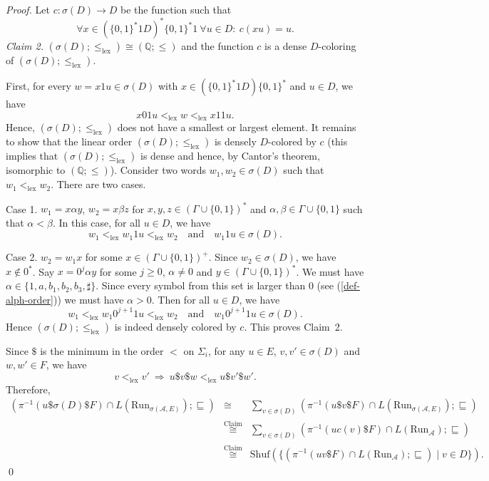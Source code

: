 \documentclass[envcountsame]{llncs}
\newcommand{\A}{\mathcal A}
\newcommand{\lex}{\mathrm{lex}}
\newcommand{\Q}{\mathbb Q}
\newcommand{\Run}{\mathrm{Run}}
\newcommand{\Shuf}{\mathrm{Shuf}}
\begin{document}
\begin{proof}
\medskip

\noindent
Let $c:\sigma(D)\rightarrow D$ be the function such that
\[
    \forall x\in (\{0,1\}^*1D)^*\{0,1\}^* 1\ \forall u\in D:\ c(xu)=u.
\] 
{\em Claim 2.} $(\sigma(D);\leq_{\lex})\cong (\Q;\leq)$ and the function $c$ is a dense $D$-coloring of $(\sigma(D);\leq_{\lex})$.

\medskip

\noindent
First, for every $w=x1u\in \sigma(D)$ with $x\in (\{0,1\}^*1D)\{0,1\}^*$ and $u\in D$, we have
\[
    x01u <_{\lex} w <_{\lex} x11u.
\]
Hence, $(\sigma(D); \leq_{\lex})$ does not have a smallest or largest element. 
It remains to show that the linear order $(\sigma(D); \leq_{\lex})$ is densely 
$D$-colored by $c$ (this implies that $(\sigma(D); \leq_{\lex})$ is dense and 
hence, by Cantor's theorem, isomorphic to $(\Q;\leq)$). Consider two words 
$w_1,w_2\in \sigma(D)$ such that $w_1<_{\lex} w_2$. There are two cases.

\medskip

\noindent Case 1. $w_1 = x\alpha y$, $w_2=x\beta z$ for 
$x,y,z\in (\Gamma \cup\{0,1\})^*$ and $\alpha,\beta\in \Gamma\cup\{0,1\}$ 
such that $\alpha<\beta$. In this case, for all $u\in D$, we have
\[
    w_1 <_{\lex} w_1 1 u <_{\lex} w_2 \quad\text{and}\quad w_1 1 u \in
    \sigma(D) .
\]

\noindent Case 2. $w_2=w_1 x$ for some $x\in (\Gamma \cup\{0,1\})^+$. Since 
$w_2\in \sigma(D)$, we have $x\notin 0^*$. Say $x=0^j\alpha y$ for some $j\geq 0$, 
$\alpha \neq 0$ and $y\in (\Gamma \cup\{0,1\})^*$. 
We must have $\alpha \in \{1, a,b_1,b_2,b_3,\sharp\}$. Since every symbol
from this set is larger than $0$ (see (\ref{def-alph-order})) we must have $\alpha > 0$.
Then for all $u\in D$, we have
\[
    w_1 <_{\lex} w_1 0^{j+1} 1 u <_{\lex} w_2 \quad\text{and}\quad w_1 0^{j+1} 1 u \in
    \sigma(D).
\]
Hence $(\sigma(D);\leq_{\lex})$ is indeed densely colored by $c$. This proves Claim~2.

\medskip

\noindent
Since $\$$ is the minimum in the order $<$ on $\Sigma_i$, for any $u\in E$, $v,v'\in \sigma(D)$ and $w,w'\in F$, we have
\[
   v <_{\lex} v' \ \Longrightarrow \ u\$ v \$ w <_{\lex} u \$ v'\$ w'.
\]
Therefore,
\begin{eqnarray*}
    (\pi^{-1}(u\$ \sigma(D) \$ F) \cap L(\Run_{\sigma(\A,E)}) ; \sqsubseteq) 
     &\cong & \sum_{v\in \sigma(D)}(\pi^{-1}(u\$ v \$ F) \cap L(\Run_{\sigma(\A,E)}); \sqsubseteq) \\
     & \stackrel{\text{Claim 1}}{\cong} & \sum_{v\in \sigma(D)}(\pi^{-1}(u c(v) \$ F) \cap L(\Run_{\A}); \sqsubseteq) \\
     & \stackrel{\text{Claim 2}}{\cong} & \Shuf(\{(\pi^{-1}(u v\$ F)\cap L(\Run_\A);  \sqsubseteq) \mid v\in D\}) .
\end{eqnarray*}
\qed
\end{proof}
\end{document}
